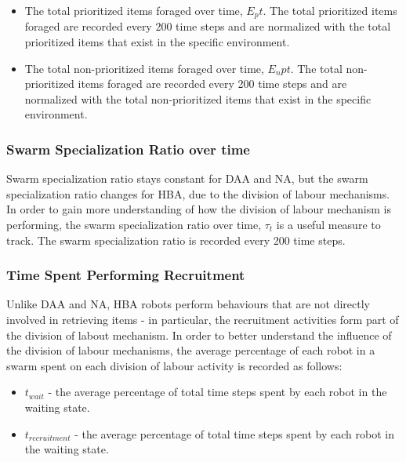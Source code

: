 \begin{itemize}
\item The total prioritized items foraged over time, $E_pt$. The total prioritized items foraged are recorded every 200 time steps and are normalized with the total prioritized items that exist in the specific environment.
\item The total non-prioritized items foraged over time, $E_npt$. The total non-prioritized items foraged are recorded every 200 time steps and are normalized with the total non-prioritized items that exist in the specific environment.
\end{itemize}

\subsubsection{Swarm Specialization Ratio over time}
Swarm specialization ratio stays constant for DAA and NA, but the swarm specialization ratio changes for HBA, due to the division of labour mechanisms. In order to gain more understanding of how the division of labour mechanism is performing, the swarm specialization ratio over time, $\tau_t$ is a useful measure to track. The swarm specialization ratio is recorded every 200 time steps.

\subsubsection{Time Spent Performing Recruitment}
Unlike DAA and NA, HBA robots perform behaviours that are not directly involved in retrieving items - in particular, the recruitment activities form part of the division of labout mechanism. In order to better understand the influence of the division of labour mechanisms, the average percentage of each robot in a swarm spent on each division of labour activity is recorded as follows:

\begin{itemize}
\item $t_{wait}$ - the average percentage of total time steps spent by each robot in the waiting state.
\item $t_{recruitment}$ - the average percentage of total time steps spent by each robot in the waiting state.
\end{itemize}



